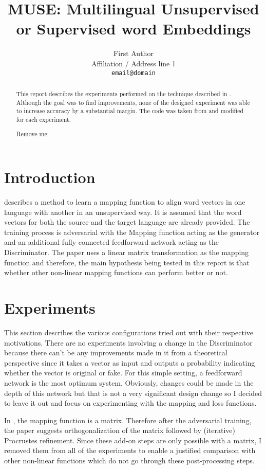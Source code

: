 \documentclass[11pt]{article}
\title{MUSE: Multilingual Unsupervised or Supervised word Embeddings}
\author{First Author \\
  Affiliation / Address line 1 \\
  {\tt email@domain}}
\date{}
\begin{document}
\maketitle
\begin{abstract}
This report describes the experiments performed on the technique described in \cite{conneau2017word}. Although the goal was to find improvements, none of the designed experiment was able to increase accuracy by a substantial margin. The code was taken from \cite{muserepo} and modified for each experiment.

Remove me: \cite{lample2017unsupervised}

\end{abstract}

\section{Introduction}
\cite{conneau2017word} describes a method to learn a mapping function to align word vectors in one language with another in an unsupervised way. It is assumed that the word vectors for both the source and the target language are already provided. The training process is adversarial with the Mapping function acting as the generator and an additional fully connected feedforward network acting as the Discriminator. The paper uses a linear matrix transformation as the mapping function and therefore, the main hypothesis being tested in this report is that whether other non-linear mapping functions can perform better or not.

\section{Experiments}
This section describes the various configurations tried out with their respective motivations. There are no experiments involving a change in the Discriminator because there can't be any improvements made in it from a theoretical perspective since it takes a vector as input and outputs a probability indicating whether the vector is original or fake. For this simple setting, a feedforward network is the most optimum system. Obviously, changes could be made in the depth of this network but that is not a very significant design change so I decided to leave it out and focus on experimenting with the mapping and loss functions.

In \cite{conneau2017word}, the mapping function is a matrix. Therefore after the adversarial training, the paper suggests orthogonalization of the matrix followed by (iterative) Procrustes refinement. Since these add-on steps are only possible with a matrix, I removed them from all of the experiments to enable a justified comparison with other non-linear functions which do not go through these post-processing steps.
\end{document}
